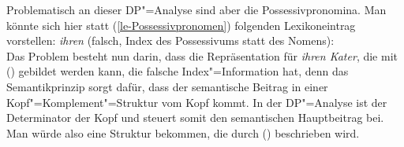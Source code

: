 Problematisch an dieser DP"=Analyse sind aber die Possessivpronomina. Man könnte sich
hier statt (\ref{le-Possessivpronomen}) folgenden Lexikoneintrag vorstellen:
\eas
\textit{ihren} (falsch, Index des Possessivums statt des Nomens):\\
\zs
Das Problem besteht nun darin, dass die Repräsentation für \emph{ihren Kater},
die mit () gebildet werden kann, die falsche Index"=Information hat, denn das Semantikprinzip
sorgt dafür, dass der semantische Beitrag in einer Kopf"=Komplement"=Struktur vom Kopf kommt. In der
DP"=Analyse ist der Determinator der Kopf und steuert somit den semantischen Hauptbeitrag bei. Man
würde also eine Struktur bekommen, die durch () beschrieben wird.
